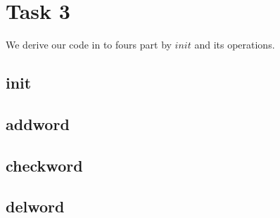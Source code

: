\documentclass[a4paper,12pt,fleqn]{scrartcl}
\begin{document}
\section{Task 3}
We derive our code in to fours part by $init$ and its operations. 
\subsection{init}
\subsection{addword}
\subsection{checkword}
\subsection{delword}
\end{document}
